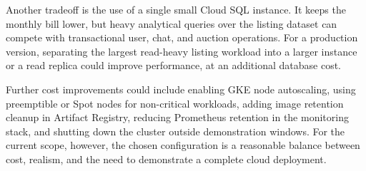 Another tradeoff is the use of a single small Cloud SQL instance. It keeps the monthly bill lower, but heavy analytical queries over the listing dataset can compete with transactional user, chat, and auction operations. For a production version, separating the largest read-heavy listing workload into a larger instance or a read replica could improve performance, at an additional database cost.

Further cost improvements could include enabling GKE node autoscaling, using preemptible or Spot nodes for non-critical workloads, adding image retention cleanup in Artifact Registry, reducing Prometheus retention in the monitoring stack, and shutting down the cluster outside demonstration windows. For the current scope, however, the chosen configuration is a reasonable balance between cost, realism, and the need to demonstrate a complete cloud deployment.
